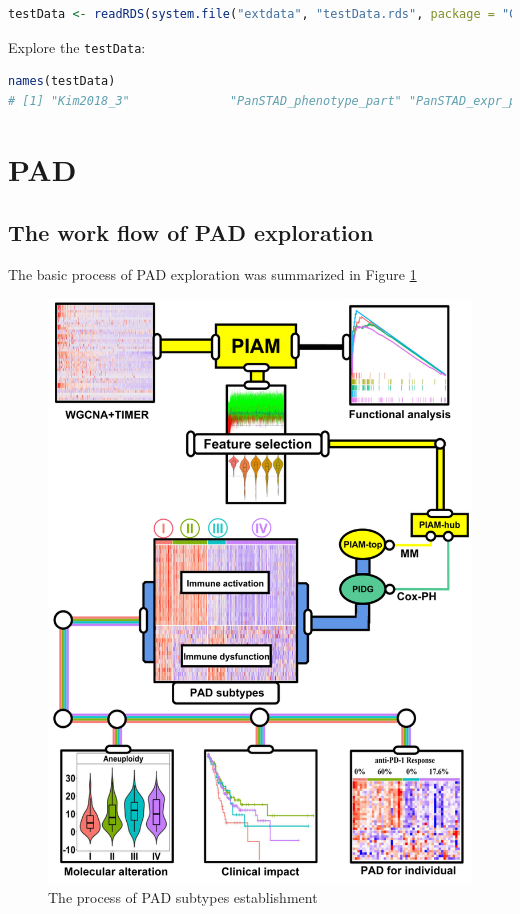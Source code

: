 \documentclass[
  12pt,
]{book}
\newcommand{\passthrough}[1]{#1}
\begin{document}
\begin{lstlisting}[language=R]
testData <- readRDS(system.file("extdata", "testData.rds", package = "GSClassifier"))
\end{lstlisting}

Explore the \passthrough{\lstinline!testData!}:

\begin{lstlisting}[language=R]
names(testData)
# [1] "Kim2018_3"              "PanSTAD_phenotype_part" "PanSTAD_expr_part"
\end{lstlisting}

\hypertarget{pad}{%
\section{PAD}\label{pad}}

\hypertarget{the-work-flow-of-pad-exploration}{%
\subsection{The work flow of PAD exploration}\label{the-work-flow-of-pad-exploration}}

The basic process of PAD exploration was summarized in Figure \ref{fig:flpad}

\begin{figure}

{\centering \includegraphics[width=0.9\linewidth]{./fig/Flowchart-PAD} 

}

\caption{The process of PAD subtypes establishment}\label{fig:flpad}
\end{figure}
\end{document}
